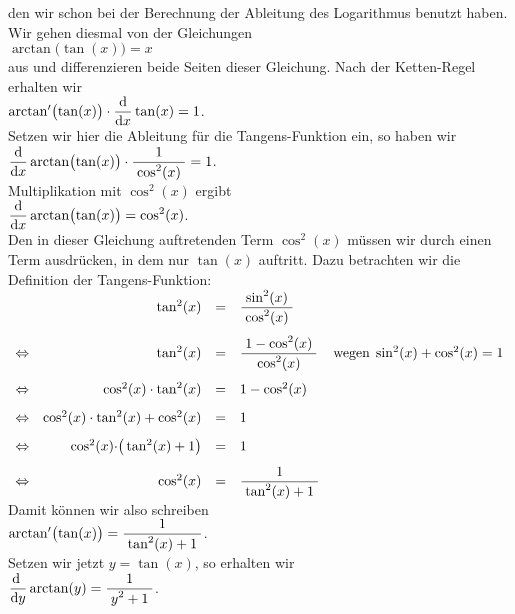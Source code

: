 \begin{enumerate}
      den wir schon bei der Berechnung der Ableitung des Logarithmus benutzt haben.
      Wir gehen diesmal von der Gleichungen 
      \\[0.2cm]
      \hspace*{1.3cm}
      $\arctan\bigl(\tan(x)\bigr) = x$
      \\[0.2cm]
      aus und differenzieren beide Seiten dieser Gleichung.  Nach der Ketten-Regel erhalten wir 
      \\[0.3cm]
      \hspace*{1.3cm}
      $\arctan'\bigl(\tan(x)\bigr) \cdot \displaystyle\frac{\textrm{d}}{\textrm{d}x} \tan(x) = 1$.
      \\[0.3cm]
      Setzen wir hier die Ableitung f\"ur die Tangens-Funktion ein, so haben wir
      \\[0.3cm]
      \hspace*{1.3cm}
      $\displaystyle \displaystyle\frac{\textrm{d}}{\textrm{d}x} \arctan\bigl(\tan(x)\bigr) \cdot \displaystyle\frac{\;\displaystyle1\;}{\;\displaystyle\cos^2(x)\;} = 1$.
      \\[0.3cm]
      Multiplikation mit $\cos^2(x)$ ergibt
      \\[0.3cm]
      \hspace*{1.3cm}
      $\displaystyle \displaystyle\frac{\textrm{d}}{\textrm{d}x} \arctan\bigl(\tan(x)\bigr) = \cos^2(x)$.
      \\[0.3cm]
      Den in dieser  Gleichung auftretenden Term $\cos^2(x)$ m\"ussen wir durch einen Term ausdr\"ucken, in dem
      nur $\tan(x)$ auftritt.  Dazu betrachten wir die Definition der Tangens-Funktion:      
      \\[0.3cm]
      \hspace*{1.3cm}
      $
      \begin{array}[t]{lrcll}
                & \tan^2(x) & = & \displaystyle\frac{\;\displaystyle\sin^2(x)\;}{\;\displaystyle\cos^2(x)\;} \\[0.5cm] 
\Leftrightarrow & \tan^2(x) & = & \displaystyle\frac{\;\displaystyle1 - \cos^2(x)\;}{\;\displaystyle\cos^2(x)\;} & \mbox{wegen}\; \sin^2(x) + \cos^2(x) = 1 \\[0.5cm] 
\Leftrightarrow & \cos^2(x) \cdot \tan^2(x) & = & 1 - \cos^2(x) &  \\[0.3cm] 
\Leftrightarrow & \cos^2(x) \cdot \tan^2(x) + \cos^2(x) & = & 1  &  \\[0.3cm] 
\Leftrightarrow & \cos^2(x) \cdot \bigr(\tan^2(x) + 1\bigr) & = & 1  &  \\[0.3cm] 
\Leftrightarrow & \cos^2(x)  & = &  \displaystyle\frac{\;\displaystyle1\;}{\;\displaystyle\tan^2(x) + 1\;} &  
      \end{array}
      $
      \\[0.3cm]
      Damit k\"onnen wir also schreiben 
      \\[0.3cm]
      \hspace*{1.3cm}
      $\arctan'\bigl(\tan(x)\bigr) = \displaystyle\frac{\;\displaystyle1\;}{\;\displaystyle\tan^2(x) + 1\;}$.
      \\[0.3cm]
      Setzen wir jetzt $y = \tan(x)$, so erhalten wir 
      \\[0.3cm]
      \hspace*{1.3cm}
      $\displaystyle\frac{\mathrm{d}\;}{\mathrm{d}y} \arctan(y) = \displaystyle\frac{\;\displaystyle1\;}{\;\displaystyle y^2 + 1\;}$.
\end{enumerate}

